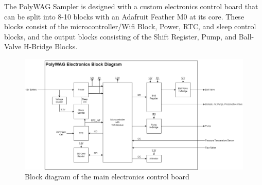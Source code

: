 \documentclass[11pt, letterpaper]{article}
\begin{document}
The PolyWAG Sampler is designed with a custom electronics control board that can be split into 8-10 blocks with an Adafruit Feather M0 at its core. These blocks consist of the microcontroller/Wifi Block, Power, RTC, and sleep control blocks, and the output blocks consisting of the Shift Register, Pump, and Ball-Valve H-Bridge Blocks. 

\begin{figure}[H]
	\centering
	\includegraphics[scale=0.4]{./Assets/Electronics Block Diagram.png}
	\caption{Block diagram of the main electronics control board}
\end{figure}
\end{document}
